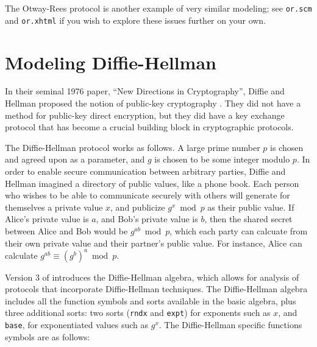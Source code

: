   The Otway-Rees
protocol is another example of very similar modeling; see
\texttt{or.scm} and \texttt{or.xhtml} if you wish to explore these
issues further on your own.

\section{Modeling Diffie-Hellman}
\label{sec:dh}

In their seminal 1976 paper, ``New Directions in Cryptography'',
Diffie and Hellman proposed the notion of public-key cryptography
\cite{DiffieHellman76}.  They did not have a method for public-key direct
encryption, but they did have a key exchange protocol that has become
a crucial building block in cryptographic protocols.

The Diffie-Hellman protocol works as follows.  A large prime number
$p$ is chosen and agreed upon as a parameter, and $g$ is chosen to be
some integer modulo $p$.  In order to enable secure communication
between arbitrary parties, Diffie and Hellman imagined a directory of
public values, like a phone book.  Each person who wishes to be able
to communicate securely with others will generate for themselves a
private value $x$, and publicize $g^x \bmod p$ as their public value.
If Alice's private value is $a$, and Bob's private value is $b$, then
the shared secret between Alice and Bob would be $g^{ab} \bmod p$,
which each party can calcuate from their own private value and their
partner's public value.  For instance, Alice can calculate $g^{ab}
\equiv (g^b)^a \bmod p$.

Version 3 of {\cpsa} introduces the Diffie-Hellman algebra, which
allows for analysis of protocols that incorporate Diffie-Hellman
techniques.  The Diffie-Hellman algebra includes all the function
symbols and sorts available in the basic algebra, plus three
additional sorts: two sorts (\texttt{rndx} and \texttt{expt}) for
exponents such as $x$, and \texttt{base}, for exponentiated values
such as $g^x$.  The Diffie-Hellman specific functions symbols are as
follows:

